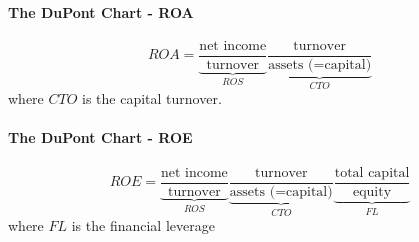 \documentclass[a4paper] {scrartcl}
\begin{document}
\paragraph{The DuPont Chart - ROA} %
\label{par:the_dupont_chart}
\begin{equation}
	ROA = 
	\underbrace{\frac{\text{net income}}{\text{turnover}}}_{ROS}
	\underbrace{\frac{\text{turnover}}{\text{assets (=capital)}}}_{CTO}
\end{equation}
where $CTO$ is the capital turnover.

\paragraph{The DuPont Chart - ROE} %
\label{par:the_dupont_chart}
\begin{equation}
	ROE = 
	\underbrace{\frac{\text{net income}}{\text{turnover}}}_{ROS}
	\underbrace{\frac{\text{turnover}}{\text{assets (=capital)}}}_{CTO}
	\underbrace{\frac{\text{total capital}}{\text{equity}}}_{FL}
\end{equation}
where $FL$ is the financial leverage
\end{document}
